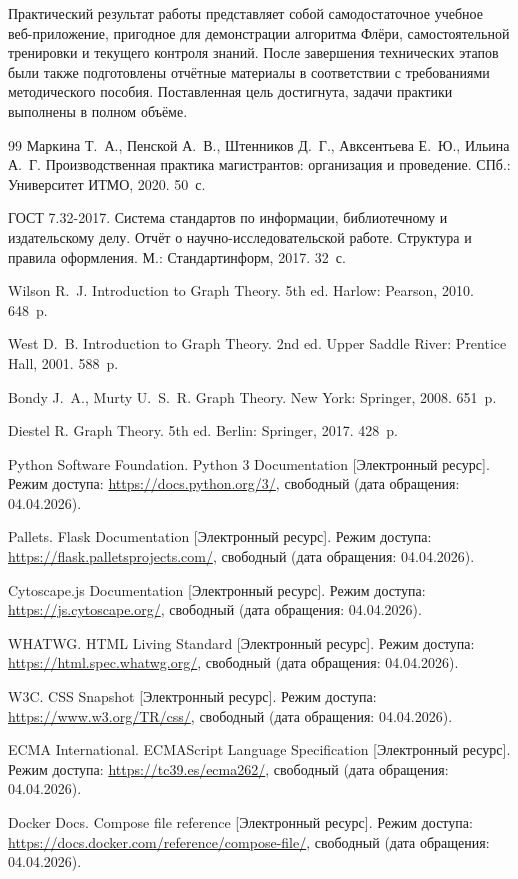 \documentclass[a4paper,12pt]{extarticle}
\begin{document}
Практический результат работы представляет собой самодостаточное учебное веб-приложение, пригодное для демонстрации алгоритма Флёри, самостоятельной тренировки и текущего контроля знаний. После завершения технических этапов были также подготовлены отчётные материалы в соответствии с требованиями методического пособия. Поставленная цель достигнута, задачи практики выполнены в полном объёме.


\vspace{0.35\baselineskip}
\enlargethispage{3\baselineskip}
\renewcommand{\refname}{}
\begin{thebibliography}{99}
\setlength{\topsep}{0pt}
\setlength{\itemsep}{0pt}
\setlength{\parskip}{0pt}
Маркина Т.~А., Пенской А.~В., Штенников Д.~Г., Авксентьева Е.~Ю., Ильина А.~Г. Производственная практика магистрантов: организация и проведение. СПб.: Университет ИТМО, 2020. 50~с.

ГОСТ 7.32-2017. Система стандартов по информации, библиотечному и издательскому делу. Отчёт о научно-исследовательской работе. Структура и правила оформления. М.: Стандартинформ, 2017. 32~с.

Wilson R.~J. Introduction to Graph Theory. 5th ed. Harlow: Pearson, 2010. 648~p.

West D.~B. Introduction to Graph Theory. 2nd ed. Upper Saddle River: Prentice Hall, 2001. 588~p.

Bondy J.~A., Murty U.~S.~R. Graph Theory. New York: Springer, 2008. 651~p.

Diestel R. Graph Theory. 5th ed. Berlin: Springer, 2017. 428~p.

Python Software Foundation. Python 3 Documentation [Электронный ресурс]. Режим доступа: \url{https://docs.python.org/3/}, свободный (дата обращения: 04.04.2026).

Pallets. Flask Documentation [Электронный ресурс]. Режим доступа: \url{https://flask.palletsprojects.com/}, свободный (дата обращения: 04.04.2026).

Cytoscape.js Documentation [Электронный ресурс]. Режим доступа: \url{https://js.cytoscape.org/}, свободный (дата обращения: 04.04.2026).

WHATWG. HTML Living Standard [Электронный ресурс]. Режим доступа: \url{https://html.spec.whatwg.org/}, свободный (дата обращения: 04.04.2026).

W3C. CSS Snapshot [Электронный ресурс]. Режим доступа: \url{https://www.w3.org/TR/css/}, свободный (дата обращения: 04.04.2026).

ECMA International. ECMAScript Language Specification [Электронный ресурс]. Режим доступа: \url{https://tc39.es/ecma262/}, свободный (дата обращения: 04.04.2026).

Docker Docs. Compose file reference [Электронный ресурс]. Режим доступа: \url{https://docs.docker.com/reference/compose-file/}, свободный (дата обращения: 04.04.2026).
\end{thebibliography}
\end{document}
